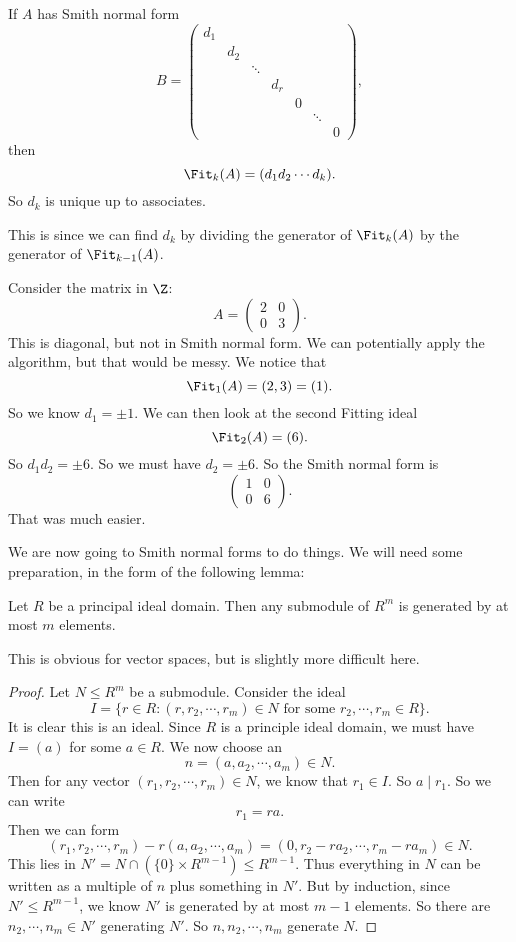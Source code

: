 \documentclass[a4paper]{article}
\begin{document}
\begin{cor}
  If $A$ has Smith normal form
  \[
    B =
    \begin{pmatrix}
      d_1\\
      & d_2\\
      & & \ddots\\
      & & & d_r\\
      & & & & 0\\
      & & & & & \ddots\\
      & & & & & & 0
    \end{pmatrix},
  \]
  then
  \[
    \Fit_k(A) = (d_1 d_2 \cdots d_k).
  \]
  So $d_k$ is unique up to associates.
\end{cor}
This is since we can find $d_k$ by dividing the generator of $\Fit_k(A)$ by the generator of $\Fit_{k - 1}(A)$.

\begin{eg}
  Consider the matrix in $\Z$:
  \[
    A = \begin{pmatrix}
      2 & 0\\
      0 & 3
    \end{pmatrix}.
  \]
  This is diagonal, but not in Smith normal form. We can potentially apply the algorithm, but that would be messy. We notice that
  \[
    \Fit_1(A) = (2, 3) = (1).
  \]
  So we know $d_1 = \pm 1$. We can then look at the second Fitting ideal
  \[
    \Fit_2(A) = (6).
  \]
  So $d_1 d_2 = \pm 6$. So we must have $d_2 = \pm 6$. So the Smith normal form is
  \[
    \begin{pmatrix}
      1 & 0\\
      0 & 6
    \end{pmatrix}.
  \]
  That was much easier.
\end{eg}

We are now going to Smith normal forms to do things. We will need some preparation, in the form of the following lemma:
\begin{lemma}
  Let $R$ be a principal ideal domain. Then any submodule of $R^m$ is generated by at most $m$ elements.
\end{lemma}
This is obvious for vector spaces, but is slightly more difficult here.

\begin{proof}
  Let $N \leq R^m$ be a submodule. Consider the ideal
  \[
    I = \{r \in R: (r, r_2, \cdots, r_m) \in N\text{ for some }r_2, \cdots, r_m \in R\}.
  \]
  It is clear this is an ideal. Since $R$ is a principle ideal domain, we must have $I = (a)$ for some $a \in R$. We now choose an
  \[
    n = (a, a_2, \cdots, a_m) \in N.
  \]
  Then for any vector $(r_1, r_2, \cdots, r_m) \in N$, we know that $r_1 \in I$. So $a \mid r_1$. So we can write
  \[
    r_1 = ra.
  \]
  Then we can form
  \[
    (r_1, r_2, \cdots, r_m) - r(a, a_2, \cdots, a_m) = (0, r_2 - ra_2, \cdots, r_m - r a_m)\in N.
  \]
  This lies in $N' = N \cap (\{0\} \times R^{m - 1}) \leq R^{m - 1}$. Thus everything in $N$ can be written as a multiple of $n$ plus something in $N'$. But by induction, since $N' \leq R^{m - 1}$, we know $N'$ is generated by at most $m - 1$ elements. So there are $n_2, \cdots, n_m \in N'$ generating $N'$. So $n, n_2, \cdots, n_m$ generate $N$.
\end{proof}
\end{document}
